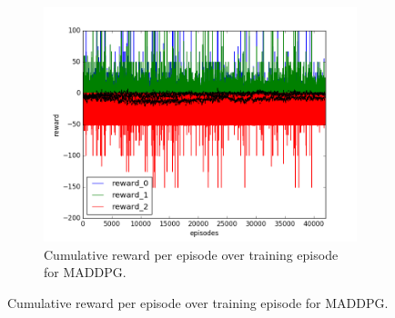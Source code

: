 \begin{figure}[h]
\begin{subfigure}[h]{\figscale\linewidth}
    \includegraphics[trim=10 10 10 10,clip,width=\linewidth]
    {../results/maddpg_1vs2/reward.png}
    \caption{Cumulative reward per episode over training episode for MADDPG.}
    \label{fig:maddpg-1vs2-reward}
  \end{subfigure}


\end{figure}
